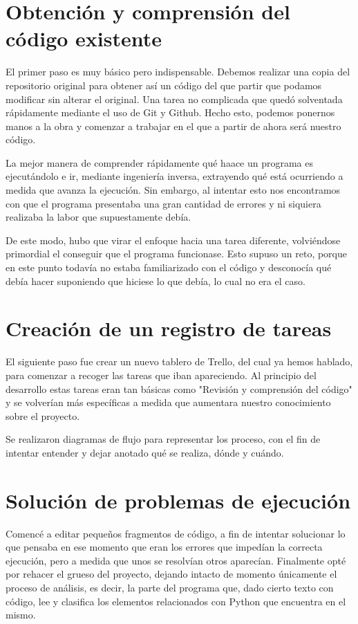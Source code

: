 \documentclass[a4paper, 12pt]{book}
\begin{document}
\section{Obtención y comprensión del código existente}

El primer paso es muy básico pero indispensable. Debemos realizar una copia del repositorio original para obtener así un código del que partir que podamos modificar sin alterar el original. Una tarea no complicada que quedó solventada rápidamente mediante el uso de Git y Github. Hecho esto, podemos ponernos manos a la obra y comenzar a trabajar en el que a partir de ahora será nuestro código.

La mejor manera de comprender rápidamente qué haace un programa es ejecutándolo e ir, mediante ingeniería inversa, extrayendo qué está ocurriendo a medida que avanza la ejecución. Sin embargo, al intentar esto nos encontramos con que el programa presentaba una gran cantidad de errores y ni siquiera realizaba la labor que supuestamente debía. 

De este modo, hubo que virar el enfoque hacia una tarea diferente, volviéndose primordial el conseguir que el programa funcionase. Esto supuso un reto, porque en este punto todavía no estaba familiarizado con el código y desconocía qué debía hacer suponiendo que hiciese lo que debía, lo cual no era el caso.

\section{Creación de un registro de tareas}

El siguiente paso fue crear un nuevo tablero de Trello, del cual ya hemos hablado, para comenzar a recoger las tareas que iban apareciendo. Al principio del desarrollo estas tareas eran tan básicas como "Revisión y comprensión del código" y se volverían más específicas a medida que aumentara nuestro conocimiento sobre el proyecto.

Se realizaron diagramas de flujo para representar los proceso, con el fin de intentar entender y dejar anotado qué se realiza, dónde y cuándo.

\section{Solución de problemas de ejecución}

Comencé a editar pequeños fragmentos de código, a fin de intentar solucionar lo que pensaba en ese momento que eran los errores que impedían la correcta ejecución, pero a medida que unos se resolvían otros aparecían. Finalmente opté por rehacer el grueso del proyecto, dejando intacto de momento únicamente el proceso de análisis, es decir, la parte del programa que, dado cierto texto con código, lee y clasifica los elementos relacionados con Python que encuentra en el mismo.
\end{document}

